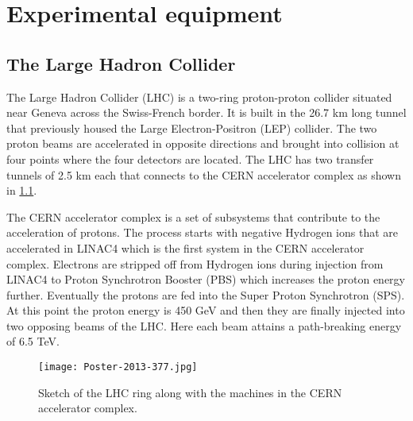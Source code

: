 
\chapter{Experimental equipment}
\label{sec:LHCATLAS}



\section{The Large Hadron Collider}
The Large Hadron Collider (LHC)\cite{LyndonEvans_2008} is a two-ring proton-proton collider situated near Geneva across the Swiss-French border. It is built in 
the 26.7 km long tunnel that previously housed the Large Electron-Positron (LEP) collider. The two proton beams are accelerated in opposite directions and 
brought into collision at four points where the four detectors are located. The LHC has two transfer tunnels of 2.5 km each that connects to the CERN accelerator
complex as shown in \cref{fig:acc_complex}. 

The CERN accelerator complex is a set of subsystems that contribute to the acceleration of protons. The process 
starts with negative Hydrogen ions that are accelerated in LINAC4 which is the first system in the CERN accelerator complex. Electrons are stripped off from 
Hydrogen ions during injection from LINAC4 to Proton Synchrotron Booster (PBS) which increases the proton energy further. Eventually the protons are fed into 
the Super Proton Synchrotron (SPS). At this point the proton energy is 450 GeV and then they are finally injected into two opposing beams of the LHC. Here each beam 
attains a path-breaking energy of 6.5 TeV. 

\begin{figure}[htbp]
    \centering
    \texttt{[image: Poster-2013-377.jpg]}
    \caption[Sketch of the CERN accelerator complex]{Sketch of the LHC ring along with the machines in the CERN accelerator complex\cite{Haffner:1621894}.}%
    \label{fig:acc_complex}
\end{figure}

